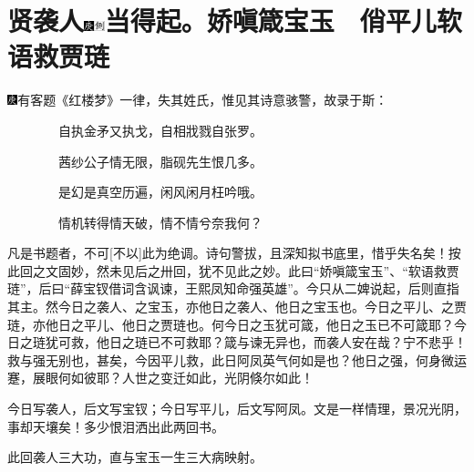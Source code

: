 

\chapter[贤袭人娇嗔箴宝玉\hspace{.5em}　俏平儿软语救贾琏]{\texorpdfstring{贤袭人{\protect\includegraphics[width=3mm]{../Images/00004}\protect\includegraphics[width=3mm]{../Images/00011}\footnotesize \kaishu 当得起。}娇嗔箴宝玉　俏平儿软语救贾琏}{贤袭人庚辰本侧批当得起。娇嗔箴宝玉　俏平儿软语救贾琏}}
{\includegraphics[width=3mm]{../Images/00004}有客题《红楼梦》一律，失其姓氏，惟见其诗意骇警，故录于斯：}

{　　　　自执金矛又执戈，自相戕戮自张罗。}

{　　　　茜纱公子情无限，脂砚先生恨几多。}

{　　　　是幻是真空历遍，闲风闲月枉吟哦。}

{　　　　情机转得情天破，情不情兮奈我何？}

{凡是书题者，不可{[}不以{]}此为绝调。诗句警拔，且深知拟书底里，惜乎失名矣！按此回之文固妙，然未见后之卅回，犹不见此之妙。此曰``娇嗔箴宝玉''、``软语救贾琏''，后曰``薛宝钗借词含讽谏，王熙凤知命强英雄''。今只从二婢说起，后则直指其主。然今日之袭人、之宝玉，亦他日之袭人、他日之宝玉也。今日之平儿、之贾琏，亦他日之平儿、他日之贾琏也。何今日之玉犹可箴，他日之玉已不可箴耶？今日之琏犹可救，他日之琏已不可救耶？箴与谏无异也，而袭人安在哉？宁不悲乎！救与强无别也，甚矣，今因平儿救，此日阿凤英气何如是也？他日之强，何身微运蹇，展眼何如彼耶？人世之变迁如此，光阴倏尔如此！}

{今日写袭人，后文写宝钗；今日写平儿，后文写阿凤。文是一样情理，景况光阴，事却天壤矣！多少恨泪洒出此两回书。}

{此回袭人三大功，直与宝玉一生三大病映射。}

